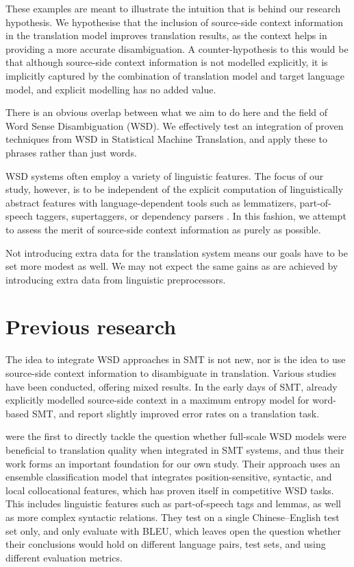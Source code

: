 \documentclass[smallextended]{svjour3}       %
\theoremstyle{break}
\begin{document}
These examples are meant to illustrate the intuition that is behind our
research hypothesis. We hypothesise that the inclusion of source-side context
information in the translation model improves translation results, as the
context helps in providing a more accurate disambiguation. A counter-hypothesis
to this would be that although source-side context information is not modelled
explicitly, it is implicitly captured by the combination of translation model
and target language model, and explicit modelling has no added value.

There is an obvious overlap between what we aim to do here and the field of
Word Sense Disambiguation (WSD). We effectively test an integration of proven
techniques from WSD in Statistical Machine Translation, and apply these to
phrases rather than just words.

WSD systems often employ a variety of linguistic features. The focus of our
study, however, is to be independent of the explicit computation of
linguistically abstract features with language-dependent tools such as
lemmatizers, part-of-speech taggers, supertaggers, or dependency parsers
\cite{Rejwanul+11}. 
In this fashion, we attempt to assess the merit of source-side
context information as purely as possible.

Not introducing extra data for the translation system means our goals have to
be set more modest as well. We may not expect the same gains as are achieved by
introducing extra data from linguistic preprocessors.

\section{Previous research}

The idea to integrate WSD approaches in SMT is not new, nor is the idea to use
source-side context information to disambiguate in translation. Various studies
have been conducted, offering mixed results. In the early days of SMT,
\cite{GarciaVarea+02} already explicitly modelled source-side context in a
maximum entropy model for word-based SMT, and report slightly improved error
rates on a translation task.

\cite{CarpuatWu05} were the first to directly tackle the question whether
full-scale WSD models were beneficial to translation quality when integrated in
SMT systems, and thus their work forms an important foundation for our own study.
Their approach uses an ensemble classification model that integrates
position-sensitive, syntactic, and local collocational features, which has
proven itself in competitive WSD tasks. This includes linguistic features such
as part-of-speech tags and lemmas, as well as more complex syntactic relations.
They test on a single Chinese--English test set only, and only
evaluate with BLEU,
which leaves open the question whether their conclusions would hold on
different language pairs, test sets, and using different evaluation metrics.
\end{document}
